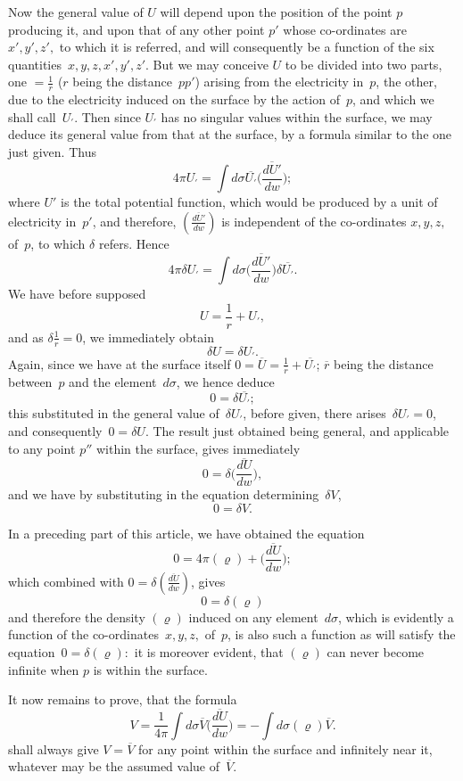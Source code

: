 \documentclass[11pt,notitlepage]{amsart}
\renewcommand{\rho}{\varrho}
\begin{document}
Now the general value of $U$ will depend upon the position of the
point $p$ producing it, and upon that of any other point $p'$ whose co-ordinates
are $x',y',z',$ to which it is referred, and will consequently be a function of
the six quantities~$x,y,z,x',y',z'$.
But we may conceive $U$ to be divided
into two parts, one $=\frac1r$ ($r$ being the distance~$pp'$)
arising from the electricity
in~$p$, the other, due to the electricity induced
on the surface by the action of~$p$,
and which we shall call~$U_\prime$.
Then since $U_\prime$ has no singular values within
the surface, we may deduce its general value from that at the surface, by a
formula similar to the one just given. Thus
\[
4\pi U_\prime=\int d\sigma\overline{U_\prime}
\biggl(\frac{\overline{dU'}}{dw}\biggr);
\]
where $U'$ is the total potential function, which would be produced by a unit
of electricity in~$p'$, and therefore,
$(\frac{\overline{dU'}}{dw})$ is independent of the co-ordinates
$x,y,z,$ of~$p$, to which $\delta$ refers. Hence
\[
4\pi\delta U_\prime=\int d\sigma
\biggl(\frac{\overline{dU'}}{dw}\biggr)\delta\overline{U_\prime}.
\]
We have before supposed
\[
U=\frac1r+U_\prime,
\]
and as $\delta\frac1r=0$, we immediately obtain
\[
\delta U=\delta U_\prime.
\]
Again, since we have at the surface itself
$0=\overline{U}=\frac{1}{\overline{r}}+\overline{U_\prime}$;
$\overline{r}$ being the
distance between~$p$ and the element~$d\sigma$, we hence deduce
\[
0=\delta\overline{U_\prime};
\]
this substituted in the general value of~$\delta U_\prime$,
before given, there arises~$\delta U_\prime=0$,
and consequently~$0=\delta U$.
The result just obtained being general, and applicable
to any point $p''$ within the surface, gives immediately
\[
0=\delta
\biggl(\frac{\overline{dU}}{dw}\biggr),
\]
and we have by substituting in the equation determining~$\delta V$,
\[
0=\delta V.
\]

In a preceding part of this article, we have obtained the equation
\[
0=4\pi(\rho)+\biggl(\frac{\overline{dU}}{dw}\biggr);
\]
which combined with $0=\delta(\frac{\overline{dU}}{dw})$, gives
\[
0=\delta(\rho)
\]
and therefore the density $(\rho)$ induced on
any element~$d\sigma$, which is evidently
a function of the co-ordinates~$x,y,z,$ of~$p$, is also such a function as will
satisfy the equation~$0=\delta(\rho):$
it is moreover evident, that $(\rho)$ can never become
infinite when $p$ is within the surface.

It now remains to prove, that the formula
\[
V=\frac{1}{4\pi}\int d\sigma\overline{V}
\biggl(\frac{\overline{dU}}{dw}\biggr)
=-\int d\sigma(\rho)\overline{V}.
\]
shall always give $V=\overline{V}$
for any point within the surface and infinitely near
it, whatever may be the assumed value of~$\overline{V}$.
\end{document}
